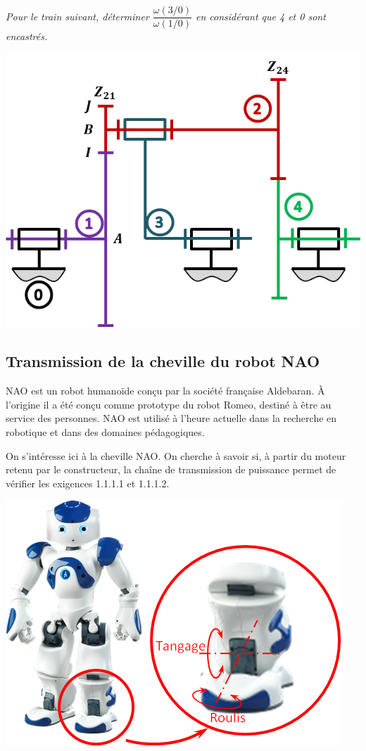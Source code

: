 \documentclass[10pt,fleqn]{article} %
\begin{document}
\begin{multicols}{2}
\subparagraph{}\textit{Pour le train suivant, déterminer $\dfrac{\omega(3/0)}{\omega(1/0)}$ en considérant que 4 et 0 sont encastrés.}

\begin{center}
\includegraphics[width=\linewidth]{images/train_04}
\end{center}



\subsection*{Transmission de la cheville du robot NAO}
\setcounter{exo}{0}
NAO est un robot humanoïde conçu par la société française Aldebaran. \`A l'origine il a été conçu comme prototype du robot Romeo, destiné à être au service des personnes. NAO est utilisé à l'heure actuelle dans la recherche en robotique et dans des domaines pédagogiques. 
\begin{obj}
On s'intéresse ici à la cheville NAO. On cherche à savoir si, à partir du moteur retenu par le constructeur, la chaîne de transmission de puissance permet de vérifier les exigences 1.1.1.1 et 1.1.1.2.
\end{obj}

\begin{center}
\includegraphics[width=.95\linewidth]{images/Cheville}
\end{center}



\end{multicols}
\end{document}
